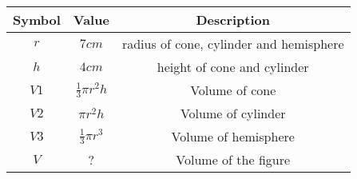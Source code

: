 
\begin{tabular}{|c|c|c|}
\hline
 Symbol & Value & Description \\
\hline
 $r$  & $7cm$  & radius of cone, cylinder and hemisphere  \\
 \hline
 $h$  & $4cm$  & height of cone and cylinder  \\
\hline
$V1$ & $\frac{1}{3} \pi r^2 h$ & Volume of cone\\
\hline
$V2$ & $\pi r^2 h$ & Volume of cylinder\\
\hline
$V3$ & $\frac{1}{3} \pi r^3$ & Volume of hemisphere\\
\hline
$V$ & ? & Volume of the figure\\
\hline
\end{tabular}